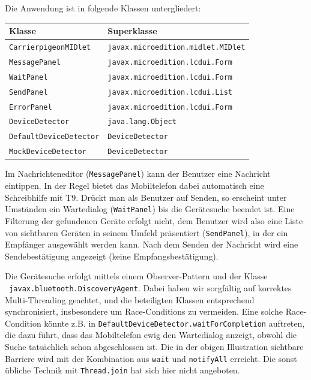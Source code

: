 \documentclass[ngerman]{article}
\begin{document}
Die Anwendung ist in folgende Klassen untergliedert:

\begin{tabular}{|l|l|}
    \hline
    {\bf Klasse} & {\bf Superklasse} \\
    \hline
    {\tt CarrierpigeonMIDlet} & {\tt javax.microedition.midlet.MIDlet} \\
    \hline
    {\tt MessagePanel} & {\tt javax.microedition.lcdui.Form} \\
    \hline
    {\tt WaitPanel} & {\tt javax.microedition.lcdui.Form} \\
    \hline
    {\tt SendPanel} & {\tt javax.microedition.lcdui.List} \\
    \hline
    {\tt ErrorPanel} & {\tt javax.microedition.lcdui.Form} \\
    \hline
    {\tt DeviceDetector} & {\tt java.lang.Object}\\
    \hline
    {\tt DefaultDeviceDetector} & {\tt DeviceDetector} \\
    \hline
    {\tt MockDeviceDetector} & {\tt DeviceDetector} \\
    \hline
\end{tabular}

Im Nachrichteneditor ({\tt MessagePanel}) kann der Benutzer eine Nachricht
eintippen.  In der Regel bietet das Mobiltelefon dabei automatisch eine
Schreibhilfe mit T9. Drückt man als Benutzer auf Senden, so erscheint unter
Umständen ein Wartedialog ({\tt WaitPanel}) bis die  Gerätesuche beendet ist.
Eine Filterung der gefundenen Geräte erfolgt nicht, dem Benutzer wird also eine
Liste von sichtbaren Geräten in seinem Umfeld präsentiert ({\tt SendPanel}), in
der ein Empfänger ausgewählt werden kann. Nach dem Senden der Nachricht wird
eine Sen\-de\-be\-stä\-ti\-gung angezeigt (keine Empfangsbestätigung).

Die Gerätesuche erfolgt mittels einem Observer-Pattern und der Klasse \\{\tt
javax.bluetooth.DiscoveryAgent}.  Dabei haben wir sorgfältig auf korrektes
Multi-Threading geachtet, und die beteiligten Klassen entsprechend
synchronisiert, insbesondere um Race-Conditions zu vermeiden. Eine solche
Race-Condi\-tion könnte z.B. in {\tt DefaultDeviceDetector.waitForCompletion}
auftreten, die dazu führt, dass das Mobiltelefon ewig den Wartedialog anzeigt,
obwohl die Suche tatsächlich schon abgeschlossen ist. Die in der obigen
Illustration sichtbare Barriere wird mit der Kombination aus {\tt wait} und
{\tt notifyAll} erreicht. Die sonst übliche Technik mit {\tt Thread.join} hat
sich hier nicht angeboten.
\end{document}

